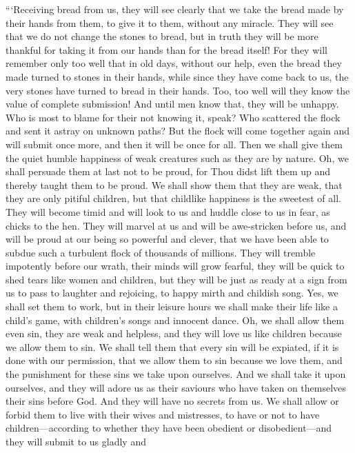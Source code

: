 ```Receiving bread from us, they will see clearly that we take the
bread made by their hands from them, to give it to them, without any
miracle. They will see that we do not change the stones to bread, but
in truth they will be more thankful for taking  it from our
hands than for the bread itself! For they will remember only too well
that in old days, without our help, even the bread they made turned to
stones in their hands, while since they have come back to us, the very
stones have turned to bread in their hands. Too, too well will they
know the value of complete submission! And until men know that, they
will be unhappy. Who is most to blame for their not knowing it, speak?
Who scattered the flock and sent it astray on unknown paths? But the
flock will come together again and will submit once more, and then it
will be once for all. Then we shall give them the quiet humble
happiness of weak creatures such as they are by nature. Oh, we shall
persuade them at last not to be proud, for Thou didst lift them up and
thereby taught them to be proud. We shall show them that they are
weak, that they are only pitiful children, but that childlike
happiness is the sweetest of all. They will become timid and will look
to us and huddle close to us in fear, as chicks to the hen. They will
marvel at us and will be awe-stricken before us, and will be proud at
our being so powerful and clever, that we have been able to subdue
such a turbulent flock of thousands of millions. They will tremble
impotently before our wrath, their minds will grow fearful, they will
be quick to shed tears like women and children, but they will be just
as ready at a sign from us to pass to laughter and rejoicing, to happy
mirth and childish song. Yes, we shall set them to work, but in their
leisure hours we shall make their life like a child's game, with
children's songs and innocent dance. Oh, we shall allow them even sin,
they are weak and helpless, and they will love us like children
because we allow them to sin. We shall tell them that every sin will
be expiated, if it is done with our permission, that we allow them to
sin because we love them, and the punishment for these sins we take
upon ourselves. And we shall take it upon ourselves, and they will
adore us as their saviours who have taken on themselves their sins
before God. And they will have no secrets from us. We shall allow or
forbid them to live with their wives and mistresses, to have or not to
have chil\-dren---ac\-cord\-ing to whether they have been obedient or
dis\-o\-be\-di\-ent---and they will submit to us gladly and
